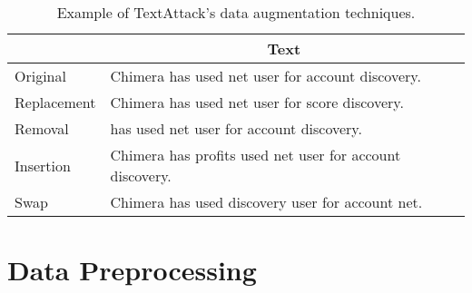 \documentclass[11pt]{article}
\begin{document}
\begin{table*}[h]
\centering
\begin{tabular}{|l|l|}
\hline
\rowcolor[HTML]{C0C0C0} 
\multicolumn{1}{|c|}{\cellcolor[HTML]{C0C0C0}\textbf{Technique}} & \multicolumn{1}{c|}{\cellcolor[HTML]{C0C0C0}\textbf{Text}} \\ \hline
Original & Chimera has used net user for account discovery. \\ \hline
Replacement & Chimera has used net user for score discovery. \\ \hline
Removal & has used net user for account discovery. \\ \hline
Insertion & Chimera has profits used net user for account discovery. \\ \hline
Swap & Chimera has used discovery user for account net. \\ \hline
\end{tabular}
\caption{Example of TextAttack's data augmentation techniques.}
\label{tab:data-augmentation}
\end{table*}

\clearpage
\section{Data Preprocessing}
\label{sec:prep}
\end{document}
